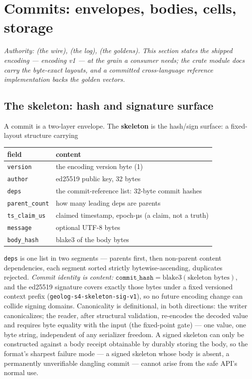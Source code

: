 \section{Commits: envelopes, bodies, cells, storage}
\label{sec:gr-commits}

\emph{Authority:  (the wire),
 (the log),
 (the goldens). This section states the
shipped encoding — \emph{encoding v1} — at the grain a consumer
needs; the crate module docs carry the byte-exact layouts, and a
committed cross-language reference implementation backs the golden
vectors.}

\subsection{The skeleton: hash and signature surface}
\label{sec:gr-skeleton}

A commit is a two-layer envelope. The \textbf{skeleton} is the
hash/sign surface: a fixed-layout structure carrying

\begin{center}
\small
\begin{tabular}{ll}
\toprule
field & content \\
\midrule
\texttt{version} & the encoding version byte (1) \\
\texttt{author} & ed25519 public key, 32 bytes \\
\texttt{deps} & the commit-reference list: 32-byte commit hashes \\
\texttt{parent\_count} & how many leading deps are parents \\
\texttt{ts\_claim\_us} & claimed timestamp, epoch-µs (a claim, not a truth) \\
\texttt{message} & optional UTF-8 bytes \\
\texttt{body\_hash} & blake3 of the body bytes \\
\bottomrule
\end{tabular}
\end{center}

\noindent \texttt{deps} is one list in two segments — parents first,
then non-parent content dependencies, each segment sorted strictly
bytewise-ascending, duplicates rejected. \emph{Commit identity is
content:} $\texttt{commit\_hash} = \mathrm{blake3}(\text{skeleton
bytes})$, and the ed25519 signature covers exactly those bytes under
a fixed versioned context prefix
(\texttt{geolog-s4-skeleton-sig-v1}), so no future encoding change
can collide signing domains. Canonicality is definitional, in both
directions: the writer canonicalizes; the reader, after structural
validation, re-encodes the decoded value and requires byte equality
with the input (the fixed-point gate) — one value, one byte string,
independent of any serializer freedom. A signed skeleton can only be
constructed against a body receipt obtainable by durably storing the
body, so the format's sharpest failure mode — a signed skeleton whose
body is absent, a permanently unverifiable dangling commit — cannot
arise from the safe API's normal use.

